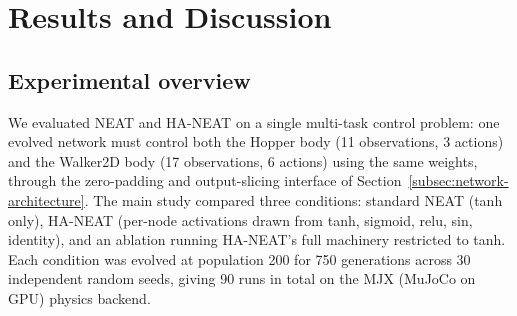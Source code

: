 \documentclass[12pt]{article}
\begin{document}


\newpage

\section{Results and Discussion}
\label{sec:results-and-discussion}

\subsection{Experimental overview}
\label{subsec:experimental-overview}
We evaluated NEAT and HA-NEAT on a single multi-task control problem: one evolved network must control both the Hopper body (11 observations, 3 actions) and the Walker2D body (17 observations, 6 actions) using the same weights, through the zero-padding and output-slicing interface of Section~\ref{subsec:network-architecture}.
The main study compared three conditions: standard NEAT (tanh only), HA-NEAT (per-node activations drawn from tanh, sigmoid, relu, sin, identity), and an ablation running HA-NEAT's full machinery restricted to tanh.
Each condition was evolved at population 200 for 750 generations across 30 independent random seeds, giving 90 runs in total on the MJX (MuJoCo on GPU) physics backend.
\end{document}
